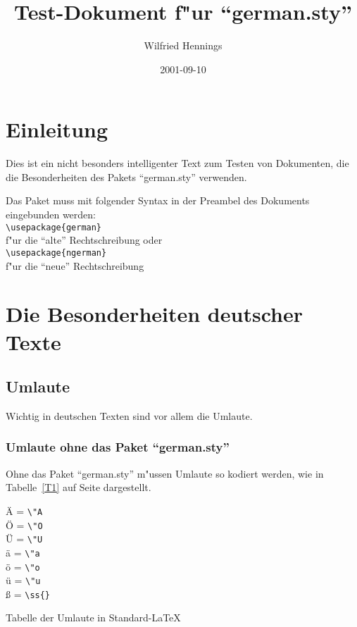 \documentclass[11pt]{report} %
\title{Test-Dokument f"ur "`german.sty"'}
\author{Wilfried Hennings}
\date{2001-09-10}
\begin{document}
\maketitle

\tableofcontents

\chapter{Einleitung}
Dies ist ein nicht besonders intelligenter Text zum Testen von
Dokumenten, die die Besonderheiten des Pakets "`german.sty"' verwenden.

Das Paket muss mit folgender Syntax in der Preambel des Dokuments
eingebunden werden:\\
\verb|\usepackage{german}|\\
f"ur die "`alte"' Rechtschreibung oder \\
\verb|\usepackage{ngerman}|\\
f"ur die "`neue"' Rechtschreibung 


\chapter{Die Besonderheiten deutscher Texte}
\section{Umlaute}

Wichtig in deutschen Texten sind vor allem die Umlaute.

\subsection{Umlaute ohne das Paket "`german.sty"'}
Ohne das Paket "`german.sty"' m"ussen Umlaute so kodiert werden, wie in
Tabelle~\ref{T1} auf Seite \pageref{T1} dargestellt.
\begin{table}[ht]
\"A = \verb|\"A|\\
\"O = \verb|\"O|\\
\"U = \verb|\"U|\\
\"a = \verb|\"a|\\
\"o = \verb|\"o|\\
\"u = \verb|\"u|\\
\ss{} = \verb|\ss{}|
\caption{Tabelle der Umlaute in Standard-LaTeX} 
\label{T1}
\end{table}
\end{document}
